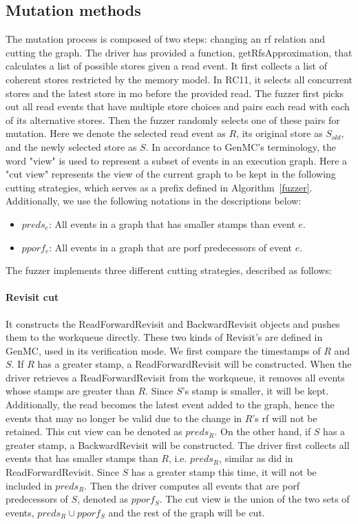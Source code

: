 \subsection{Mutation methods}

The mutation process is composed of two steps: changing an rf relation and cutting the graph. The driver has provided a function, getRfsApproximation, that calculates a list of possible stores given a read event. It first collects a list of coherent stores restricted by the memory model. In RC11, it selects all concurrent stores and the latest store in mo before the provided read. The fuzzer first picks out all read events that have multiple store choices and pairs each read with each of its alternative stores. Then the fuzzer randomly selects one of these pairs for mutation. Here we denote the selected read event as $R$, its original store as $S_{old}$, and the newly selected store as $S$. In accordance to GenMC's terminology, the word "view" is used to represent a subset of events in an execution graph. Here a "cut view" represents the view of the current graph to be kept in the following cutting strategies, which serves as a prefix defined in Algorithm~\ref{fuzzer}. 
Additionally, we use the following notations in the descriptions below:
\begin{itemize}
	\item $preds_{e}$: All events in a graph that has smaller stamps than event $e$.
	\item $pporf_{e}$: All events in a graph that are porf predecessors of event $e$.
\end{itemize}

The fuzzer implements three different cutting strategies, described as follows:

\paragraph{Revisit cut} It constructs the ReadForwardRevisit and BackwardRevisit objects and pushes them to the workqueue directly. These two kinds of Revisit's are defined in GenMC, used in its verification mode. We first compare the timestamps of $R$ and $S$. If $R$ has a greater stamp, a ReadForwardRevisit will be constructed. When the driver retrieves a ReadForwardRevisit from the workqueue, it removes all events whose stamps are greater than $R$. Since $S$'s stamp is smaller, it will be kept. Additionally, the read becomes the latest event added to the graph, hence the events that may no longer be valid due to the change in $R$'s rf will not be retained. This cut view can be denoted as $preds_{R}$. On the other hand, if $S$ has a greater stamp, a BackwardRevisit will be constructed. The driver first collects all events that has smaller stamps than $R$, i.e. $preds_{R}$, similar as did in ReadForwardRevisit. Since $S$ has a greater stamp this time, it will not be included in $preds_{R}$. Then the driver computes all events that are porf predecessors of $S$, denoted as $pporf_{S}$. The cut view is the union of the two sets of events, $preds_{R} \cup pporf_{S}$ and the rest of the graph will be cut.

